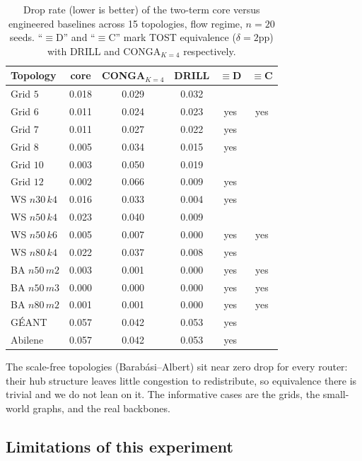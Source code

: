 \begin{table}[t]
\centering
\caption{Drop rate (lower is better) of the two-term core versus engineered
baselines across 15 topologies, flow regime, $n=20$ seeds. ``$\equiv$D'' and
``$\equiv$C'' mark TOST equivalence ($\delta=2$pp) with DRILL and CONGA$_{K=4}$
respectively.}
\label{tab:equivalence}
\small
\begin{tabular}{lccccc}
\toprule
Topology & core & CONGA$_{K=4}$ & DRILL & $\equiv$D & $\equiv$C \\
\midrule
Grid $5$      & 0.018 & 0.029 & 0.032 &     &     \\
Grid $6$      & 0.011 & 0.024 & 0.023 & yes & yes \\
Grid $7$      & 0.011 & 0.027 & 0.022 & yes &     \\
Grid $8$      & 0.005 & 0.034 & 0.015 & yes &     \\
Grid $10$     & 0.003 & 0.050 & 0.019 &     &     \\
Grid $12$     & 0.002 & 0.066 & 0.009 & yes &     \\
WS $n30\,k4$  & 0.016 & 0.033 & 0.004 & yes &     \\
WS $n50\,k4$  & 0.023 & 0.040 & 0.009 &     &     \\
WS $n50\,k6$  & 0.005 & 0.007 & 0.000 & yes & yes \\
WS $n80\,k4$  & 0.022 & 0.037 & 0.008 & yes &     \\
BA $n50\,m2$  & 0.003 & 0.001 & 0.000 & yes & yes \\
BA $n50\,m3$  & 0.000 & 0.000 & 0.000 & yes & yes \\
BA $n80\,m2$  & 0.001 & 0.001 & 0.000 & yes & yes \\
G\'EANT       & 0.057 & 0.042 & 0.053 & yes &     \\
Abilene       & 0.057 & 0.042 & 0.053 & yes &     \\
\bottomrule
\end{tabular}
\end{table}

The scale-free topologies (Barab\'asi--Albert) sit near zero drop for every
router: their hub structure leaves little congestion to redistribute, so
equivalence there is trivial and we do not lean on it. The informative cases
are the grids, the small-world graphs, and the real backbones.

\subsection{Limitations of this experiment}


